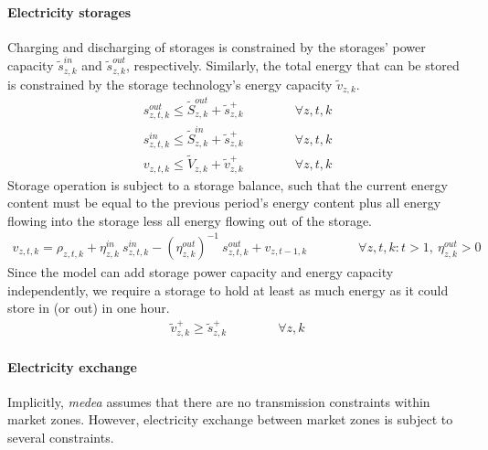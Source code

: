 \documentclass[11pt,a4paper]{article}
\begin{document}
\paragraph{Electricity storages}
Charging and discharging of storages is constrained by the storages' power capacity $\widetilde{s}^{in}_{z,k}$ and $\widetilde{s}^{out}_{z,k}$, respectively. Similarly, the total energy that can be stored is constrained by the storage technology's energy capacity $\widetilde{v}_{z,k}$.
\begin{align}
s^{out}_{z,t,k} \leq \widetilde{S}^{out}_{z,k} + \widetilde{s}^{+}_{z,k} \qquad \qquad \forall z,t,k \\
s^{in}_{z,t,k} \leq \widetilde{S}^{in}_{z,k} + \widetilde{s}^{+}_{z,k} \qquad \qquad \forall z,t,k \\
v_{z,t,k} \leq \widetilde{V}_{z,k} + \widetilde{v}^{+}_{z,k} \qquad \qquad \forall z,t,k
\end{align}
Storage operation is subject to a storage balance, such that the current energy content must be equal to the previous period's energy content plus all energy flowing into the storage less all energy flowing out of the storage.
\begin{align}
v_{z,t,k} = \rho_{z,t,k} + \eta^{in}_{z,k} \: s^{in}_{z,t,k} - (\eta^{out}_{z,k})^{-1} \: s^{out}_{z,t,k} + v_{z,t-1,k} \qquad \qquad \forall z,t,k: t>1, \: \eta^{out}_{z,k} > 0
\end{align}
Since the model can add storage power capacity and energy capacity independently, we require a storage to hold at least as much energy as it could store in (or out) in one hour.
\begin{align}
\widetilde{v}^{+}_{z,k} \geq \widetilde{s}^{+}_{z,k} \qquad \qquad \forall z,k
\end{align}

\paragraph{Electricity exchange}
Implicitly, \emph{medea} assumes that there are no transmission constraints within market zones. 
However, electricity exchange between market zones is subject to several constraints.
\end{document}
